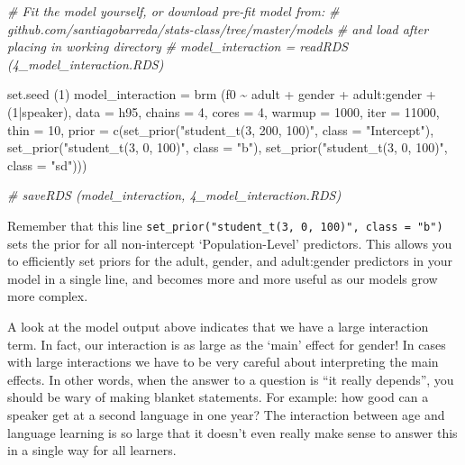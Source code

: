 \documentclass[
]{book}
\newenvironment{Shaded}{\begin{snugshade}}{\end{snugshade}}
\newcommand{\AttributeTok}[1]{\textcolor[rgb]{0.77,0.63,0.00}{#1}}
\newcommand{\CommentTok}[1]{\textcolor[rgb]{0.56,0.35,0.01}{\textit{#1}}}
\newcommand{\DecValTok}[1]{\textcolor[rgb]{0.00,0.00,0.81}{#1}}
\newcommand{\FunctionTok}[1]{\textcolor[rgb]{0.00,0.00,0.00}{#1}}
\newcommand{\NormalTok}[1]{#1}
\newcommand{\OtherTok}[1]{\textcolor[rgb]{0.56,0.35,0.01}{#1}}
\newcommand{\SpecialCharTok}[1]{\textcolor[rgb]{0.00,0.00,0.00}{#1}}
\newcommand{\StringTok}[1]{\textcolor[rgb]{0.31,0.60,0.02}{#1}}
\begin{document}
\begin{Shaded}
\begin{Highlighting}[]
\CommentTok{\# Fit the model yourself, or download pre{-}fit model from: }
\CommentTok{\# github.com/santiagobarreda/stats{-}class/tree/master/models}
\CommentTok{\# and load after placing in working directory}
\CommentTok{\#  model\_interaction = readRDS (\textquotesingle{}4\_model\_interaction.RDS\textquotesingle{})}

\FunctionTok{set.seed}\NormalTok{ (}\DecValTok{1}\NormalTok{)}
\NormalTok{model\_interaction }\OtherTok{=}  
  \FunctionTok{brm}\NormalTok{ (f0 }\SpecialCharTok{\textasciitilde{}}\NormalTok{ adult }\SpecialCharTok{+}\NormalTok{ gender }\SpecialCharTok{+}\NormalTok{ adult}\SpecialCharTok{:}\NormalTok{gender }\SpecialCharTok{+}\NormalTok{ (}\DecValTok{1}\SpecialCharTok{|}\NormalTok{speaker), }\AttributeTok{data =}\NormalTok{ h95, }
       \AttributeTok{chains =} \DecValTok{4}\NormalTok{, }\AttributeTok{cores =} \DecValTok{4}\NormalTok{, }\AttributeTok{warmup =} \DecValTok{1000}\NormalTok{, }\AttributeTok{iter =} \DecValTok{11000}\NormalTok{, }\AttributeTok{thin =} \DecValTok{10}\NormalTok{, }
       \AttributeTok{prior =} \FunctionTok{c}\NormalTok{(}\FunctionTok{set\_prior}\NormalTok{(}\StringTok{"student\_t(3, 200, 100)"}\NormalTok{, }\AttributeTok{class =} \StringTok{"Intercept"}\NormalTok{),}
                              \FunctionTok{set\_prior}\NormalTok{(}\StringTok{"student\_t(3, 0, 100)"}\NormalTok{, }\AttributeTok{class =} \StringTok{"b"}\NormalTok{),}
                              \FunctionTok{set\_prior}\NormalTok{(}\StringTok{"student\_t(3, 0, 100)"}\NormalTok{, }\AttributeTok{class =} \StringTok{"sd"}\NormalTok{))) }

\CommentTok{\#  saveRDS (model\_interaction, \textquotesingle{}4\_model\_interaction.RDS\textquotesingle{})}
\end{Highlighting}
\end{Shaded}

Remember that this line \texttt{set\_prior("student\_t(3,\ 0,\ 100)",\ class\ =\ "b")} sets the prior for all non-intercept `Population-Level' predictors. This allows you to efficiently set priors for the adult, gender, and adult:gender predictors in your model in a single line, and becomes more and more useful as our models grow more complex.

A look at the model output above indicates that we have a large interaction term. In fact, our interaction is as large as the `main' effect for gender! In cases with large interactions we have to be very careful about interpreting the main effects. In other words, when the answer to a question is ``it really depends'', you should be wary of making blanket statements. For example: how good can a speaker get at a second language in one year? The interaction between age and language learning is so large that it doesn't even really make sense to answer this in a single way for all learners.
\end{document}
